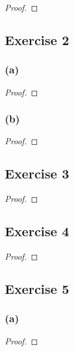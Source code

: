 \documentclass[14pt]{extarticle}
\begin{document}
\begin{proof}

\end{proof}

\subsection{Exercise 2}

\subsubsection{(a)}

\begin{proof}

\end{proof}

\subsubsection{(b)}

\begin{proof}

\end{proof}

\subsection{Exercise 3}

\begin{proof}

\end{proof}

\subsection{Exercise 4}

\begin{proof}

\end{proof}

\subsection{Exercise 5}

\subsubsection{(a)}

\begin{proof}

\end{proof}
\end{document}
